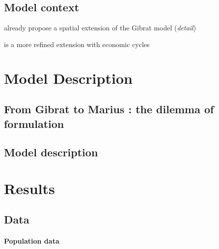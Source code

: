 \subsection{Model context}

\cite{bretagnolle2000long} already propose a spatial extension of the Gibrat model (\textit{detail})

\cite{favaro2011gibrat} is a more refined extension with economic cycles



\section{Model Description}

\subsection{From Gibrat to Marius : the dilemma of formulation}






\subsection{Model description}






\section{Results}

\subsection{Data}


\paragraph{Population data}


